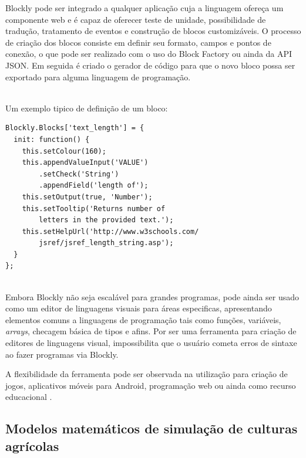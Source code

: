 \documentclass[tg]{mdtufsm}
\begin{document}
	Blockly pode ser integrado a qualquer aplicação cuja a linguagem ofereça um componente web e é capaz de oferecer teste de unidade, possibilidade de tradução, tratamento de eventos e construção de blocos customizáveis. O processo de criação dos blocos consiste em definir seu formato, campos e pontos de conexão, o que pode ser realizado com o uso do Block Factory ou ainda da API JSON. 
	Em seguida é criado o gerador de código para que o novo bloco possa ser exportado para alguma linguagem de programação.
	
	~\\
	Um exemplo tipico de definição de um bloco:
	

	\begin{lstlisting}[frame=single]
Blockly.Blocks['text_length'] = {
  init: function() {
	this.setColour(160);
	this.appendValueInput('VALUE')
		.setCheck('String')
		.appendField('length of');
	this.setOutput(true, 'Number');
	this.setTooltip('Returns number of 
		letters in the provided text.');
	this.setHelpUrl('http://www.w3schools.com/
		jsref/jsref_length_string.asp');
  }
};
    \end{lstlisting}
    
	~\\
	Embora Blockly não seja escalável para grandes programas, pode ainda ser usado como um editor de linguagens visuais para áreas especificas, apresentando elementos comuns a linguagens de programação tais como funções, variáveis, \emph{arrays}, checagem básica de tipos e afins. Por ser uma ferramenta para criação de editores de linguagens visual, impossibilita que o usuário cometa erros de sintaxe ao fazer programas via Blockly.
	

	A flexibilidade da ferramenta pode ser observada na utilização para criação de jogos, aplicativos móveis para Android, programação web ou ainda como recurso educacional \cite{blocklyGames,blocklymobile,blocklyJavaScript,blocklyEducation}.
	
	\subsection{Modelos matemáticos de simulação de culturas agrícolas}
	
\end{document}
